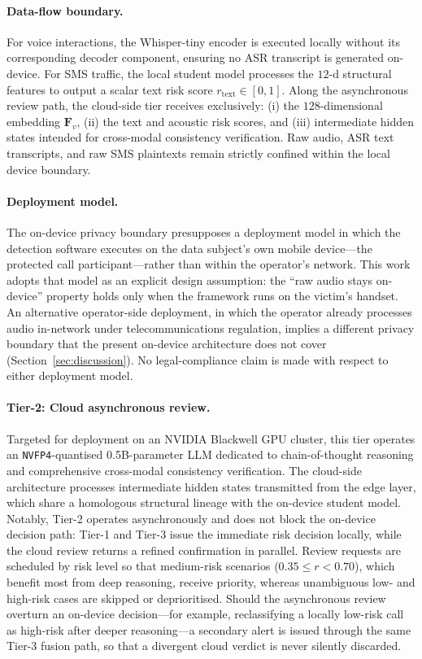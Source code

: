 \documentclass[a4paper,fleqn]{cas-sc}
\begin{document}
\paragraph{Data-flow boundary.}
For voice interactions, the Whisper-tiny encoder is executed locally without its corresponding decoder component, ensuring no ASR transcript is generated on-device. For SMS traffic, the local student model processes the $12\text{-d}$ structural features to output a scalar text risk score $r_{\text{text}} \in [0,1]$. Along the asynchronous review path, the cloud-side tier receives exclusively: (i) the $128\text{-dimensional}$ embedding $\bm{F}_v$, (ii) the text and acoustic risk scores, and (iii) intermediate hidden states intended for cross-modal consistency verification. Raw audio, ASR text transcripts, and raw SMS plaintexts remain strictly confined within the local device boundary.

\paragraph{Deployment model.}
The on-device privacy boundary presupposes a deployment model in which the detection software executes on the data subject's own mobile device---the protected call participant---rather than within the operator's network. This work adopts that model as an explicit design assumption: the ``raw audio stays on-device'' property holds only when the framework runs on the victim's handset. An alternative operator-side deployment, in which the operator already processes audio in-network under telecommunications regulation, implies a different privacy boundary that the present on-device architecture does not cover (Section~\ref{sec:discussion}). No legal-compliance claim is made with respect to either deployment model.

\paragraph{Tier-2: Cloud asynchronous review.}
Targeted for deployment on an NVIDIA Blackwell GPU cluster, this tier operates an \texttt{NVFP4}-quantised 0.5B-parameter LLM dedicated to chain-of-thought reasoning and comprehensive cross-modal consistency verification. The cloud-side architecture processes intermediate hidden states transmitted from the edge layer, which share a homologous structural lineage with the on-device student model. Notably, Tier-2 operates asynchronously and does not block the on-device decision path: Tier-1 and Tier-3 issue the immediate risk decision locally, while the cloud review returns a refined confirmation in parallel. Review requests are scheduled by risk level so that medium-risk scenarios ($0.35 \le r < 0.70$), which benefit most from deep reasoning, receive priority, whereas unambiguous low- and high-risk cases are skipped or deprioritised. Should the asynchronous review overturn an on-device decision---for example, reclassifying a locally low-risk call as high-risk after deeper reasoning---a secondary alert is issued through the same Tier-3 fusion path, so that a divergent cloud verdict is never silently discarded.
\end{document}
